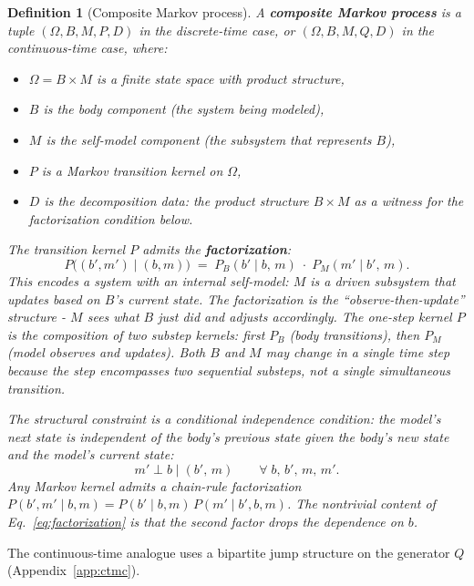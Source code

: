 \documentclass[12pt]{article}
\newtheorem{definition}[theorem]{Definition}
\theoremstyle{remark}
\begin{document}
\begin{definition}[Composite Markov process]\label{def:composite}
A \textbf{composite Markov process} is a tuple $(\Omega, B, M, P, D)$ in the discrete-time case, or $(\Omega, B, M, Q, D)$ in the continuous-time case, where:
\begin{itemize}[leftmargin=2em]
\item $\Omega = B \times M$ is a finite state space with product structure,
\item $B$ is the \emph{body} component (the system being modeled),
\item $M$ is the \emph{self-model} component (the subsystem that represents $B$),
\item $P$ is a Markov transition kernel on $\Omega$,
\item $D$ is the \emph{decomposition data}: the product structure $B \times M$ as a witness for the factorization condition below.
\end{itemize}
The transition kernel $P$ admits the \textbf{factorization}:
\begin{equation}\label{eq:factorization}
  P\bigl((b',m') \mid (b,m)\bigr) \;=\; P_B(b' \mid b,\, m)\;\cdot\; P_M(m' \mid b',\, m).
\end{equation}
This encodes a system with an internal self-model: $M$ is a driven subsystem that updates based on $B$'s current state. The factorization is the ``observe-then-update'' structure - $M$ sees what $B$ just did and adjusts accordingly. The one-step kernel $P$ is the composition of two substep kernels: first $P_B$ (body transitions), then $P_M$ (model observes and updates). Both $B$ and $M$ may change in a single time step because the step encompasses two sequential substeps, not a single simultaneous transition.

The structural constraint is a conditional independence condition: the model's next state is independent of the body's \emph{previous} state given the body's new state and the model's current state:
\begin{equation}\label{eq:cond-indep}
  m' \perp b \mid (b',\, m) \qquad \forall\; b,\, b',\, m,\, m'.
\end{equation}
Any Markov kernel admits a chain-rule factorization $P(b',m' \mid b,m) = P(b' \mid b,m)\,P(m' \mid b',b,m)$. The nontrivial content of Eq.~\ref{eq:factorization} is that the second factor drops the dependence on $b$.
\end{definition}

The continuous-time analogue uses a bipartite jump structure on the generator $Q$ (Appendix~\ref{app:ctmc}).
\end{document}
